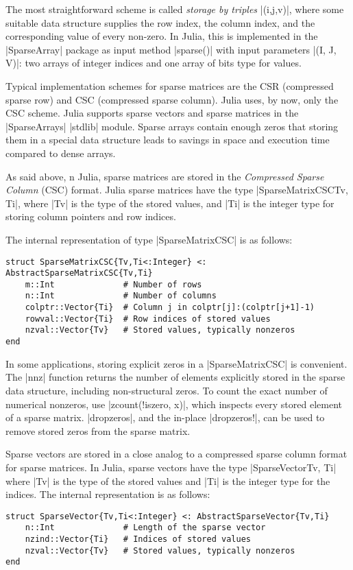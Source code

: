 The most straightforward scheme is called \emph{storage by triples} |(i,j,v)|, where some suitable data structure supplies the row index, the column index, and the corresponding value of every non-zero. In Julia, this is implemented in the |SparseArray| package as input method |sparse()| with input parameters |(I, J, V)|: two arrays of integer indices and one array of bits type for values.

Typical implementation schemes for sparse matrices are the CSR (compressed sparse row) and CSC (compressed sparse column). Julia uses, by now, only the CSC scheme.
Julia supports sparse vectors and sparse matrices in the |SparseArrays| |stdlib| module. Sparse arrays contain enough zeros that storing them in a special data structure leads to savings in space and execution time compared to dense arrays.

As said above, n Julia, sparse matrices are stored in the \emph{Compressed Sparse Column} (CSC) format. Julia sparse matrices have the type |SparseMatrixCSC{Tv, Ti}|, where |Tv| is the type of the stored values, and |Ti| is the integer type for storing column pointers and row indices. 

The internal representation of type |SparseMatrixCSC| is as follows:
\footnotesize
\begin{lstlisting}[language=JuliaLocal, style=julia]
struct SparseMatrixCSC{Tv,Ti<:Integer} <: AbstractSparseMatrixCSC{Tv,Ti}
    m::Int              # Number of rows
    n::Int              # Number of columns
    colptr::Vector{Ti}  # Column j in colptr[j]:(colptr[j+1]-1)
    rowval::Vector{Ti}  # Row indices of stored values
    nzval::Vector{Tv}   # Stored values, typically nonzeros
end
\end{lstlisting}\normalsize


In some applications, storing explicit zeros in a |SparseMatrixCSC| is convenient.
The |nnz| function returns the number of elements explicitly stored in the sparse data structure, including non-structural zeros. To count the exact number of numerical nonzeros, use |zcount(!iszero, x)|, which inspects every stored element of a sparse matrix. |dropzeros|, and the in-place |dropzeros!|, can be used to remove stored zeros from the sparse matrix.

Sparse vectors are stored in a close analog to a compressed sparse column format for sparse matrices. In Julia, sparse vectors have the type |SparseVector{Tv, Ti|} where |Tv| is the type of the stored values and |Ti| is the integer type for the indices. The internal representation is as follows:
\footnotesize
\begin{lstlisting}[language=JuliaLocal, style=julia]
struct SparseVector{Tv,Ti<:Integer} <: AbstractSparseVector{Tv,Ti}
    n::Int              # Length of the sparse vector
    nzind::Vector{Ti}   # Indices of stored values
    nzval::Vector{Tv}   # Stored values, typically nonzeros
end
\end{lstlisting}\normalsize

